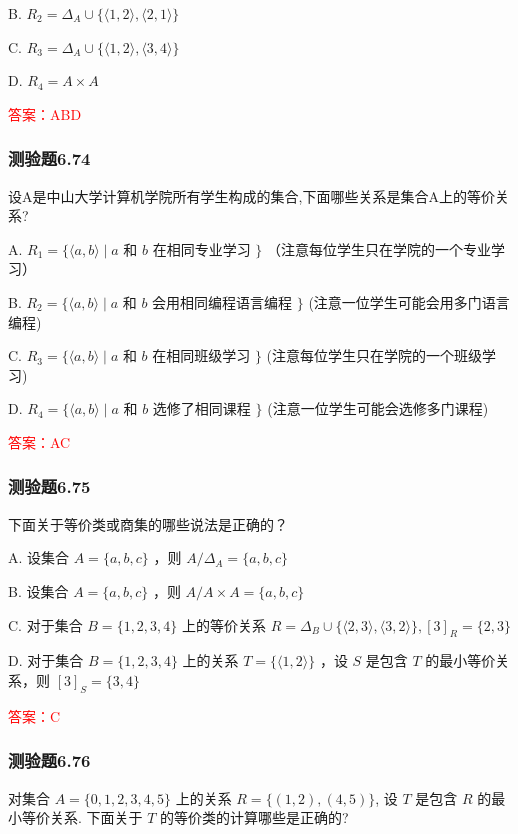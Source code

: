 \documentclass[UTF8, heading=true]{ctexart}
\begin{document}
B. $R_2=\Delta_A \cup\{\langle 1,2\rangle,\langle 2,1\rangle\}$

C. 
$R_3=\Delta_A \cup\{\langle 1,2\rangle,\langle 3,4\rangle\}$

D. $R_4=A \times A$

\textcolor{red}{答案：ABD}



\subsubsection{测验题6.74}

设A是中山大学计算机学院所有学生构成的集合,下面哪些关系是集合A上的等价关系?

A. $R_1=\{\langle a, b\rangle \mid a$ 和 $b$ 在相同专业学习 $\}$ （注意每位学生只在学院的一个专业学习）

B. $R_2=\{\langle a, b\rangle \mid a$ 和 $b$ 会用相同编程语言编程 $\}$ (注意一位学生可能会用多门语言编程)

C. $R_3=\{\langle a, b\rangle \mid a$ 和 $b$ 在相同班级学习 $\}$ (注意每位学生只在学院的一个班级学习)

D. $R_4=\{\langle a, b\rangle \mid a$ 和 $b$ 选修了相同课程 $\}$ (注意一位学生可能会选修多门课程)

\textcolor{red}{答案：AC}

\subsubsection{测验题6.75}

下面关于等价类或商集的哪些说法是正确的？

A. 设集合 $A=\{a, b, c\}$ ，则 $A / \Delta_A=\{a, b, c\}$

B. 设集合 $A=\{a, b, c\}$ ，则 $A / A \times A=\{a, b, c\}$

C. 对于集合 $B=\{1,2,3,4\}$ 上的等价关系 $R=\Delta_B \cup\{\langle 2,3\rangle,\langle 3,2\rangle\},[3]_R=\{2,3\}$

D. 对于集合 $B=\{1,2,3,4\}$ 上的关系 $T=\{\langle 1,2\rangle\}$ ，设 $S$ 是包含 $T$ 的最小等价关系，则 $[3]_S=\{3,4\}$

\textcolor{red}{答案：C}


\subsubsection{测验题6.76}

对集合 $A=\{0,1,2,3,4,5\}$ 上的关系 $R=\{(1,2),(4,5)\}$, 设 $T$ 是包含 $R$ 的最小等价关系. 下面关于 $T$ 的等价类的计算哪些是正确的?
\end{document}
